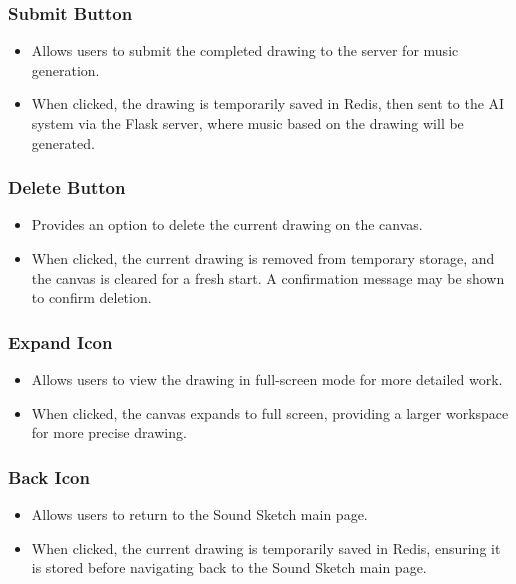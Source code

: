 \documentclass[conference]{IEEEtran}
\begin{document}
\subsubsection{Submit Button}
\begin{itemize}
    \item Allows users to submit the completed drawing to the server for music generation.\\
    \item When clicked, the drawing is temporarily saved in Redis, then sent to the AI system via the Flask server, where music based on the drawing will be generated.\\
\end{itemize}

\subsubsection{Delete Button}
\begin{itemize}
    \item Provides an option to delete the current drawing on the canvas.\\
    \item When clicked, the current drawing is removed from temporary storage, and the canvas is cleared for a fresh start. A confirmation message may be shown to confirm deletion.\\
\end{itemize}

\subsubsection{Expand Icon}
\begin{itemize}
    \item Allows users to view the drawing in full-screen mode for more detailed work.\\
    \item When clicked, the canvas expands to full screen, providing a larger workspace for more precise drawing.\\
\end{itemize}

\subsubsection{Back Icon}
\begin{itemize}
    \item Allows users to return to the Sound Sketch main page.\\
    \item When clicked, the current drawing is temporarily saved in Redis, ensuring it is stored before navigating back to the Sound Sketch main page.\\
\end{itemize}
\end{document}

